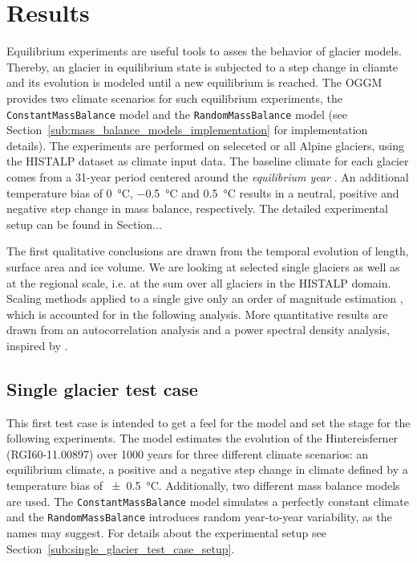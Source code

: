 \chapter{Results}\label{chap:results}
\thispagestyle{plain}

  Equilibrium experiments are useful tools to asses the behavior of glacier models. Thereby, an glacier in equilibrium state is subjected to a step change in cliamte and its evolution is modeled until a new equilibrium is reached. The OGGM provides two climate scenarios for such equilibrium experiments, the \lstinline`ConstantMassBalance` model and the \lstinline`RandomMassBalance` model (see Section~\ref{sub:mass_balance_models_implementation} for implementation details). The experiments are performed on seleceted or all Alpine glaciers, using the HISTALP dataset \citep{Auer2007} as climate input data. The baseline climate for each glacier comes from a 31-year period centered around the \textit{equilibrium year} \tstar. An additional temperature bias of \SI{0}{\celsius}, \SI{-0.5}{\celsius} and \SI{+0.5}{\celsius} results in a neutral, positive and negative step change in mass balance, respectively. The detailed experimental setup can be found in Section...

    The first qualitative conclusions are drawn from the temporal evolution of length, surface area and ice volume. We are looking at selected single glaciers as well as at the regional scale, i.e. at the sum over all glaciers in the HISTALP domain. Scaling methods applied to a single give only an order of magnitude estimation \citep[cf.][Section 8.5]{Bahr2015}, which is accounted for in the following analysis. More quantitative results are drawn from an autocorrelation analysis and a power spectral density analysis, inspired by \citet{Roe2014}. %


  \section{Single glacier test case} %
  \label{sec:single_glacier_test_case_results}

    This first test case is intended to get a feel for the \vas{} model and set the stage for the following experiments. The model estimates the evolution of the Hintereisferner (RGI60-11.00897) over 1000 years for three different climate scenarios: an equilibrium climate, a positive and a negative step change in climate defined by a temperature bias of \SI{\pm0.5}{\celsius}. Additionally, two different mass balance models are used. The \lstinline`ConstantMassBalance` model simulates a perfectly constant climate and the \lstinline`RandomMassBalance` introduces random year-to-year variability, as the names may suggest. For details about the experimental setup see Section~\ref{sub:single_glacier_test_case_setup}.

